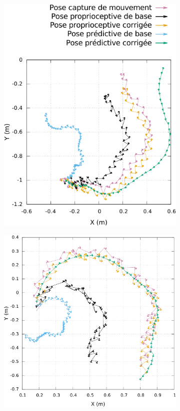 \begin{figure}[htbp]
\begin{subfigure}{0.29\paperwidth}
        \includegraphics[type=pdf,ext=.pdf,read=.pdf,width=1.0\linewidth]{../plot/OdometryLWPR/grass_open_traj2_pose}
    \end{subfigure}
    \newline
    \begin{subfigure}{0.29\paperwidth}
        \centering
        \includegraphics[type=pdf,ext=.pdf,read=.pdf,width=1.0\linewidth]{../plot/OdometryLWPR/grass_open_traj3_pose}

\end{subfigure}
\end{figure}
